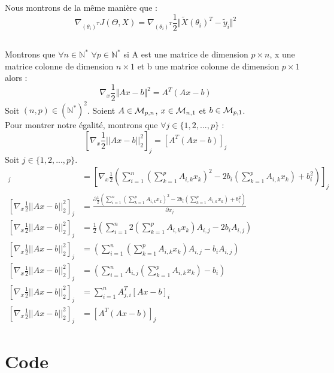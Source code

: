 \documentclass[a4paper,10pt]{article}
\begin{document}
Nous montrons de la même manière que : \[\nabla_{(\theta_{i})^T} J(\Theta, X) = \nabla_{(\theta_{i})^T}\frac{1}{2}\Vert\tilde{X}(\theta_{i})^{T}-\tilde{y}_{i}\Vert^{2}\]
\subsection{}  
\label{P2}
Montrons que $\forall n \in \mathbb{N}^{*}$ $\forall p \in \mathbb{N}^{*}$ si A est une matrice de dimension $p \times n$, x une matrice colonne de dimension $n \times 1$ et b une matrice colonne de dimension $p \times 1$ alors : \[\nabla_{x}\frac{1}{2}\Vert Ax-b \Vert^2 = A^{T}(Ax-b)\]
Soit $(n,p) \in (\mathbb{N}^*)^2$. Soient $A \in {\cal M}_{p, n}$, $x \in {\cal M}_{n, 1}$ et $b \in {\cal M}_{p, 1}$.\\
Pour montrer notre égalité, montrons que $\forall j \in \{1, 2, ..., p\}$ : \[[\nabla_{x} \frac{1}{2}||Ax - b||^{2}_{2}]_{j} = [A^{T}(Ax - b)]_{j}\]
Soit $j \in \{1, 2, ..., p\}$.
\begin{align*}  
[\nabla_{x} \frac{1}{2}||Ax - b||^{2}_{2}]_{j} &= [\nabla_{x} \frac{1}{2}(\sum^{n}_{i = 1} (\sum^{p}_{k = 1} A_{i, k}x_{k})^{2} - 2b_{i}(\sum^{p}_{k = 1} A_{i, k}x_{k}) + b_{i}^{2})]_{j}\\  
[\nabla_{x} \frac{1}{2}||Ax - b||^{2}_{2}]_{j} &= \frac{\partial\frac{1}{2}(\sum^{n}_{i = 1} (\sum^{p}_{k = 1} A_{i, k}x_{k})^{2} - 2b_{i}(\sum^{p}_{k = 1} A_{i, k}x_{k}) + b_{i}^{2})}{\partial x_{j}}\\  
[\nabla_{x} \frac{1}{2}||Ax - b||^{2}_{2}]_{j} &= \frac{1}{2}(\sum^{n}_{i = 1} 2(\sum^{p}_{k = 1} A_{i, k}x_{k})A_{i, j} - 2b_{i} A_{i, j})\\  
[\nabla_{x} \frac{1}{2}||Ax - b||^{2}_{2}]_{j} &= (\sum^{n}_{i = 1} (\sum^{p}_{k = 1} A_{i, k}x_{k})A_{i, j} - b_{i} A_{i, j})\\  
[\nabla_{x} \frac{1}{2}||Ax - b||^{2}_{2}]_{j} &= (\sum^{n}_{i = 1} A_{i, j}(\sum^{p}_{k = 1} A_{i, k}x_{k}) - b_{i} )\\  
[\nabla_{x} \frac{1}{2}||Ax - b||^{2}_{2}]_{j} &= \sum^{n}_{i = 1} A^{T}_{j, i}[Ax - b]_{i}\\  
[\nabla_{x} \frac{1}{2}||Ax - b||^{2}_{2}]_{j} &= [A^{T}(Ax - b)]_{j}  
\end{align*}

\newpage

\section{Code} 
 
\end{document}
